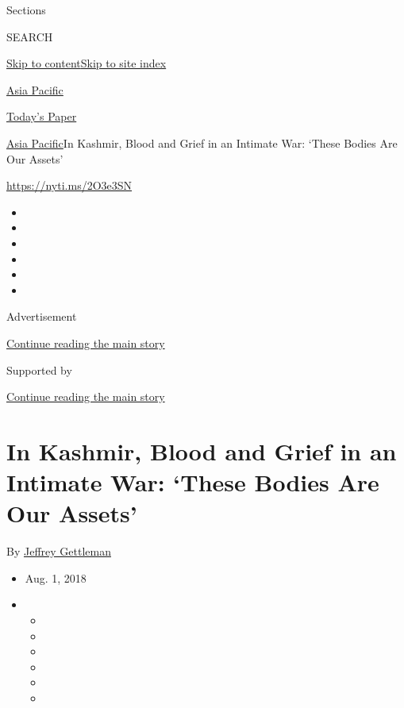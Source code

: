 Sections

SEARCH

\protect\hyperlink{site-content}{Skip to
content}\protect\hyperlink{site-index}{Skip to site index}

\href{https://www.nytimes.com/section/world/asia}{Asia Pacific}

\href{https://myaccount.nytimes.com/auth/login?response_type=cookie\&client_id=vi}{}

\href{https://www.nytimes.com/section/todayspaper}{Today's Paper}

\href{/section/world/asia}{Asia Pacific}\textbar{}In Kashmir, Blood and
Grief in an Intimate War: `These Bodies Are Our Assets'

\url{https://nyti.ms/2O3e3SN}

\begin{itemize}
\item
\item
\item
\item
\item
\item
\end{itemize}

Advertisement

\protect\hyperlink{after-top}{Continue reading the main story}

Supported by

\protect\hyperlink{after-sponsor}{Continue reading the main story}

\hypertarget{in-kashmir-blood-and-grief-in-an-intimate-war-these-bodies-are-our-assets}{%
\section{In Kashmir, Blood and Grief in an Intimate War: `These Bodies
Are Our
Assets'}\label{in-kashmir-blood-and-grief-in-an-intimate-war-these-bodies-are-our-assets}}

By \href{https://www.nytimes.com/by/jeffrey-gettleman}{Jeffrey
Gettleman}

\begin{itemize}
\item
  Aug. 1, 2018
\item
  \begin{itemize}
  \item
  \item
  \item
  \item
  \item
  \item
  \end{itemize}
\end{itemize}

